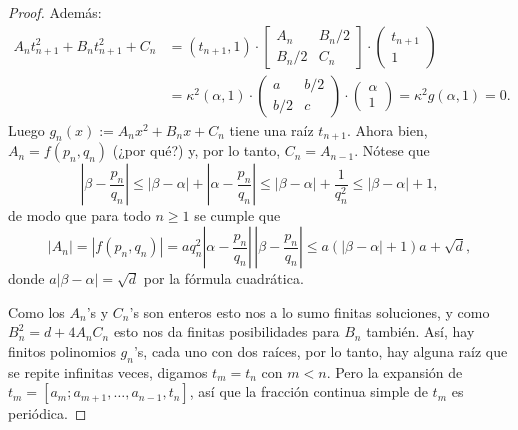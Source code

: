 \documentclass[teoria-numeros.tex]{subfiles}
\begin{document}
\begin{proof}
	Además:
	\begin{align*}
		A_nt_{n+1}^2 + B_nt_{n+1}^2 + C_n &= (t_{n+1}, 1) \cdot
		\begin{bmatrix}
			A_n & B_n/2 \\
			B_n/2 & C_n
			\end{bmatrix} \cdot \begin{pmatrix}
			t_{n+1} \\ 1
		\end{pmatrix} \\
						  &= \kappa^2 (\alpha, 1) \cdot
						  \begin{pmatrix}
							  a & b/2 \\
							  b/2 & c
							  \end{pmatrix} \cdot \begin{pmatrix}
							  \alpha \\ 1
						  \end{pmatrix} = \kappa^2 g(\alpha, 1) = 0.
	\end{align*}
	Luego $g_n(x) := A_nx^2 + B_nx + C_n$ tiene una raíz $t_{n+1}$.
	Ahora bien, $A_n = f(p_n, q_n)$ (¿por qué?) y, por lo tanto, $C_n = A_{n-1}$.
	Nótese que
	$$ \left| \beta - \frac{p_n}{q_n} \right| \le |\beta - \alpha| + \left| \alpha - \frac{p_n}{q_n} \right| \le
	|\beta - \alpha| + \frac{1}{q_n^2} \le |\beta - \alpha| + 1, $$
	de modo que para todo $n \ge 1$ se cumple que
	$$ |A_n| = |f(p_n, q_n)| = aq_n^2 \left| \alpha - \frac{p_n}{q_n} \right| \, \left| \beta - \frac{p_n}{q_n} \right| \le a(|\beta - \alpha| + 1)
	a + \sqrt{d}, $$
	donde $a|\beta - \alpha| = \sqrt{d}$ por la fórmula cuadrática.

	Como los $A_n$'s y $C_n$'s son enteros esto nos a lo sumo finitas soluciones, y como $B_n^2 = d + 4A_nC_n$ esto nos da finitas posibilidades para $B_n$
	también.
	Así, hay finitos polinomios $g_n$'s, cada uno con dos raíces, por lo tanto, hay alguna raíz que se repite infinitas veces, digamos $t_m = t_n$
	con $m < n$. Pero la expansión de $t_m = [a_m; a_{m+1}, \dots, a_{n-1}, t_n]$, así que la fracción continua simple de $t_m$ es periódica.
\end{proof}
\end{document}

